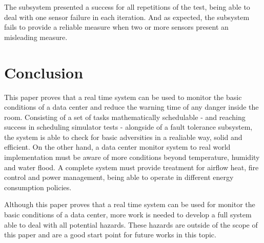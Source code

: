 \documentclass[12pt]{article}
\begin{document}
The subsystem presented a success for all repetitions of the test, being able to deal with one sensor failure in each
iteration. And as expected, the subsystem fails to provide a reliable measure when two or more sensors present an 
misleading measure.

\section{Conclusion}

This paper proves that a real time system can be used to monitor the basic conditions of a data center and reduce the warning
time of any danger inside the room. Consisting of a set of tasks mathematically schedulable - and reaching success in scheduling 
simulator tests - alongside of a fault tolerance subsystem, the system is able to check for basic adversities in a realiable 
way, solid and efficient. On the other hand, a data center monitor system to real world implementation must be aware of more 
conditions beyond temperature, humidity and water flood. A complete system must provide treatment for airflow heat, fire 
control and power management, being able to operate in different energy consumption policies.

Although this paper proves that a real time system can be used for monitor the basic conditions of a data center, more 
work is needed to develop a full system able to deal with all potential hazards. These hazards are outside of the scope of this 
paper and are a good start point for future works in this topic. 



\end{document}
